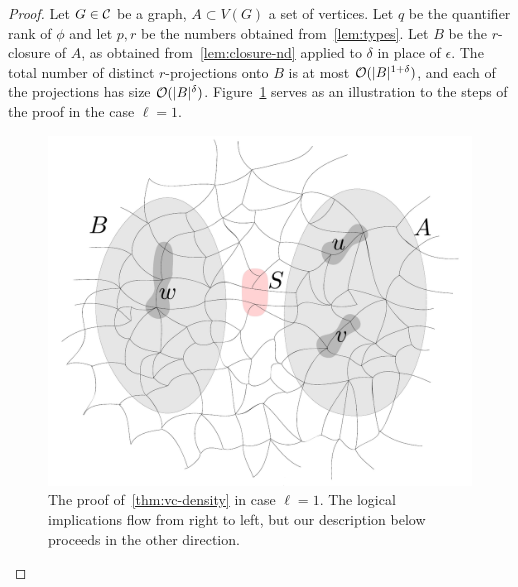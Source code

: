 \begin{proof}
%
%
%
%
Let $G\in\cal C$ be a graph, $A\subset V(G)$ a set of vertices.
	Let $q$ be the quantifier rank of $\phi$ and let 
$p,r$ be the numbers obtained from~\cref{lem:types}.
Let $B$ be the $r$-closure of $A$, as obtained from~\cref{lem:closure-nd} applied to  $\delta$ in place of $\epsilon$.
  The total number of distinct $r$-projections onto $B$ 
  is at most $\Oof(|B|^{1+\delta})$, and each of the projections has size $\Oof(|B|^{\delta})$.
  	   Figure~\ref{fig:sketch} serves as  an illustration to the steps of the proof in the case $\ell=1$.
  	   \begin{figure}[h!]
  	   	\centering
  	   		\includegraphics[scale=0.35,page=4]{pics}
  			\caption{The proof of~\cref{thm:vc-density} in case $\ell=1$. 
  The logical implications flow from right to left,
  but our description below proceeds in the other direction.
  			}
  	   	\label{fig:sketch}
  	   \end{figure}
  

\end{proof}
